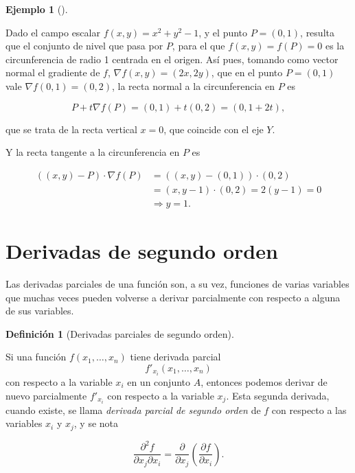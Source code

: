\documentclass[
  a4paper,
]{scrreport}
\theoremstyle{plain}
\theoremstyle{plain}
\theoremstyle{definition}
\newtheorem{definition}{Definición}[chapter]
\theoremstyle{definition}
\newtheorem{example}{Ejemplo}[chapter]
\theoremstyle{plain}
\theoremstyle{definition}
\theoremstyle{remark}
\begin{document}
\begin{example}[]\protect\hypertarget{exm-tangente-normal-funcion-implicita-plano}{}\label{exm-tangente-normal-funcion-implicita-plano}

Dado el campo escalar \(f(x,y)=x^2+y^2-1\), y el punto \(P=(0,1)\),
resulta que el conjunto de nivel que pasa por \(P\), para el que
\(f(x,y)=f(P)=0\) es la circunferencia de radio 1 centrada en el origen.
Así pues, tomando como vector normal el gradiente de \(f\),
\(\nabla f(x,y) = (2x,2y)\), que en el punto \(P=(0,1)\) vale
\(\nabla f(0,1) = (0,2)\), la recta normal a la circunferencia en \(P\)
es

\[
P + t \nabla f(P) = (0,1) + t (0,2) = (0, 1+2t),
\]

que se trata de la recta vertical \(x=0\), que coincide con el eje
\(Y\).

Y la recta tangente a la circunferencia en \(P\) es

\begin{align*}
((x,y)-P)\cdot \nabla f(P) 
&= ((x,y)-(0,1))\cdot (0,2) \\
&= (x, y-1)\cdot(0, 2) 
= 2(y-1) 
= 0 \\
&\Rightarrow y=1.
\end{align*}

\end{example}

\hypertarget{derivadas-de-segundo-orden}{%
\section{Derivadas de segundo orden}\label{derivadas-de-segundo-orden}}

Las derivadas parciales de una función son, a su vez, funciones de
varias variables que muchas veces pueden volverse a derivar parcialmente
con respecto a alguna de sus variables.

\begin{definition}[Derivadas parciales de segundo
orden]\protect\hypertarget{def-derivadas-segundo-orden}{}\label{def-derivadas-segundo-orden}

Si una función \(f(x_1,\ldots,x_n)\) tiene derivada parcial
\[f'_{x_i}(x_1,\ldots,x_n)\] con respecto a la variable \(x_i\) en un
conjunto \(A\), entonces podemos derivar de nuevo parcialmente
\(f'_{x_i}\) con respecto a la variable \(x_j\). Esta segunda derivada,
cuando existe, se llama \emph{derivada parcial de segundo orden} de
\(f\) con respecto a las variables \(x_i\) y \(x_j\), y se nota

\[\frac{\partial ^2 f}{\partial x_j \partial x_i}= \frac{\partial}{\partial x_j}\left(\frac{\partial f}{\partial x_i}\right).\]

\end{definition}
\end{document}
